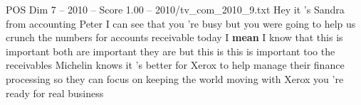 \begin{textsample}{POS Dim 7 – 2010 – Score 1.00 – 2010/tv\_com\_2010\_9.txt}  \label{ex:f7_pos_073}
Hey it 's Sandra from accounting Peter I can see that you 're busy but you were going to help us crunch the numbers for accounts receivable today I \textbf{mean} I know that this is important both are important they are but this is this is important too the receivables Michelin knows it 's better for Xerox to help manage their finance processing so they can focus on keeping the world moving with Xerox you 're ready for real business

\end{textsample}

